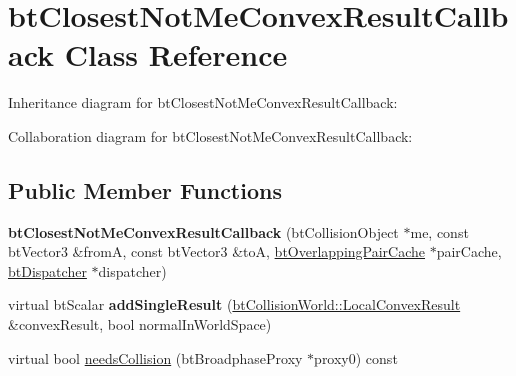 \hypertarget{classbt_closest_not_me_convex_result_callback}{\section{bt\+Closest\+Not\+Me\+Convex\+Result\+Callback Class Reference}
\label{classbt_closest_not_me_convex_result_callback}
}


Inheritance diagram for bt\+Closest\+Not\+Me\+Convex\+Result\+Callback\+:


Collaboration diagram for bt\+Closest\+Not\+Me\+Convex\+Result\+Callback\+:
\subsection*{Public Member Functions}
\begin{DoxyCompactItemize}
\item 
\hypertarget{classbt_closest_not_me_convex_result_callback_a8f523492c2d42c423e5e346678d5103f}{{\bfseries bt\+Closest\+Not\+Me\+Convex\+Result\+Callback} (bt\+Collision\+Object $\ast$me, const bt\+Vector3 \&from\+A, const bt\+Vector3 \&to\+A, \hyperlink{classbt_overlapping_pair_cache}{bt\+Overlapping\+Pair\+Cache} $\ast$pair\+Cache, \hyperlink{classbt_dispatcher}{bt\+Dispatcher} $\ast$dispatcher)}\label{classbt_closest_not_me_convex_result_callback_a8f523492c2d42c423e5e346678d5103f}

\item 
\hypertarget{classbt_closest_not_me_convex_result_callback_aa5d0f0efa8bf9810c86fdad74f36b7bd}{virtual bt\+Scalar {\bfseries add\+Single\+Result} (\hyperlink{structbt_collision_world_1_1_local_convex_result}{bt\+Collision\+World\+::\+Local\+Convex\+Result} \&convex\+Result, bool normal\+In\+World\+Space)}\label{classbt_closest_not_me_convex_result_callback_aa5d0f0efa8bf9810c86fdad74f36b7bd}

\item 
virtual bool \hyperlink{classbt_closest_not_me_convex_result_callback_a1e7a4b0520f0c6ceaad4537b835f1ee2}{needs\+Collision} (bt\+Broadphase\+Proxy $\ast$proxy0) const 
\end{DoxyCompactItemize}
